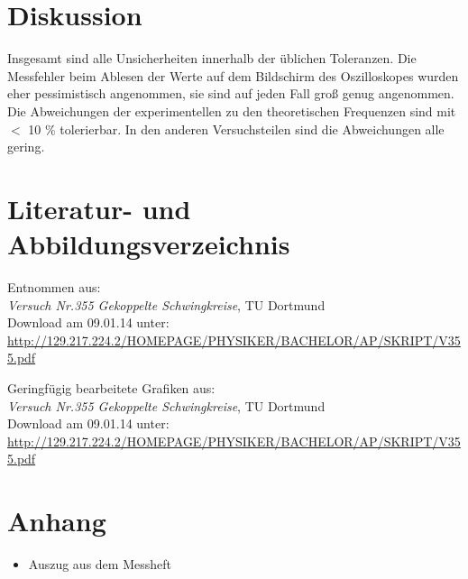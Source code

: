 \documentclass[11pt,ngerman,a4paper]{article}
\begin{document}
\section{Diskussion}
Insgesamt sind alle Unsicherheiten innerhalb der üblichen Toleranzen. Die Messfehler beim Ablesen der Werte auf dem Bildschirm des Oszilloskopes wurden eher pessimistisch angenommen, sie sind auf jeden Fall groß genug angenommen. Die Abweichungen der experimentellen zu den theoretischen Frequenzen sind mit $<$ 10 \% tolerierbar.\newline
In den anderen Versuchsteilen sind die Abweichungen alle gering.

\section{Literatur- und Abbildungsverzeichnis}
\begin{enumerate}[{[}1{]}]
\item Entnommen aus: \\\textit{Versuch Nr.355 Gekoppelte Schwingkreise}, TU Dortmund\\
Download am 09.01.14 unter:\\
\url{http://129.217.224.2/HOMEPAGE/PHYSIKER/BACHELOR/AP/SKRIPT/V355.pdf}
\item Geringfügig bearbeitete Grafiken aus:\\ \textit{Versuch Nr.355 Gekoppelte Schwingkreise}, TU Dortmund\\
Download am 09.01.14 unter:\\
\url{http://129.217.224.2/HOMEPAGE/PHYSIKER/BACHELOR/AP/SKRIPT/V355.pdf}
\end{enumerate}
\section{Anhang}
\begin{itemize}
\item Auszug aus dem Messheft
\end{itemize}
\end{document}
